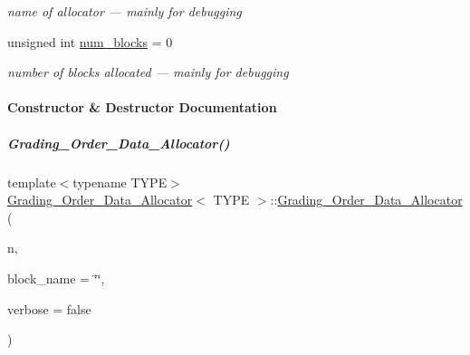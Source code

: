 \begin{DoxyCompactItemize}
\begin{DoxyCompactList}\small\item\em name of allocator --- mainly for debugging \end{DoxyCompactList}\item 
\mbox{\label{group__memorygroup_a0807060660950818df7e91a37dd6dc4b}} 
unsigned int \hyperlink{group__memorygroup_a0807060660950818df7e91a37dd6dc4b}{num\+\_\+blocks} = 0
\begin{DoxyCompactList}\small\item\em number of blocks allocated --- mainly for debugging \end{DoxyCompactList}\end{DoxyCompactItemize}


\paragraph{Constructor \& Destructor Documentation}
\mbox{\label{group__memorygroup_ad093115aea9e8428a9ef8136a008b72b}} 
\subparagraph{\texorpdfstring{Grading\+\_\+\+Order\+\_\+\+Data\+\_\+\+Allocator()}{Grading\_Order\_Data\_Allocator()}}
{\footnotesize\ttfamily template$<$typename T\+Y\+PE$>$ \\
\hyperlink{group__memorygroup_class_grading___order___data___allocator}{Grading\+\_\+\+Order\+\_\+\+Data\+\_\+\+Allocator}$<$ T\+Y\+PE $>$\+::\hyperlink{group__memorygroup_class_grading___order___data___allocator}{Grading\+\_\+\+Order\+\_\+\+Data\+\_\+\+Allocator} (\begin{DoxyParamCaption}\item[{N\+V\+A\+R\+\_\+\+T\+Y\+PE}]{n,  }\item[{const string \&}]{block\+\_\+name = {\ttfamily \char`\"{}\char`\"{}},  }\item[{bool}]{verbose = {\ttfamily false} }\end{DoxyParamCaption})\hspace{0.3cm}{\ttfamily [inline]}}




